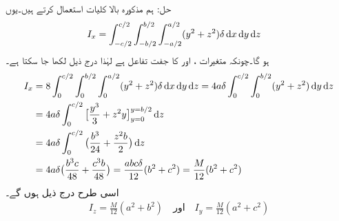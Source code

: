 حل:\quad
ہم مذکورہ بالا کلیات استعمال کرتے ہیں۔یوں
\begin{align}\label{مساوات_بالکثرت_جمودی_معیار_ایکس}
I_x&=\int_{-c/2}^{c/2}\int_{-b/2}^{b/2}\int_{-a/2}^{a/2} (y^2+z^2)\delta \dif x\dif y\dif z
\end{align}
ہو گا۔چونکہ   متغیرات ،  اور  کا جفت تفاعل ہے لہٰذا درج ذیل لکھا جا سکتا ہے۔
\begin{align*}
I_x&=8\int_{0}^{c/2}\int_{0}^{b/2}\int_{0}^{a/2} (y^2+z^2)\delta \dif x\dif y\dif z=4a\delta \int_{0}^{c/2}\int_{0}^{b/2}(y^2+z^2)\dif y\dif z\\
&=4a\delta \int_0^{c/2}\big[\frac{y^3}{3}+z^2y\big]_{y=0}^{y=b/2}\dif z\\
&=4a\delta \int_0^{c/2}\big(\frac{b^3}{24}+\frac{z^2b}{2}\big)\dif z\\
&=4a\delta \big(\frac{b^3c}{48}+\frac{c^3b}{48}\big)=\frac{abc\delta}{12}(b^2+c^2)=\frac{M}{12}(b^2+c^2)
\end{align*}
اسی طرح درج ذیل ہوں گے۔
\begin{align*}
I_z=\frac{M}{12}(a^2+b^2)\quad \text{اور}\quad I_y=\frac{M}{12}(a^2+c^2)
\end{align*}
